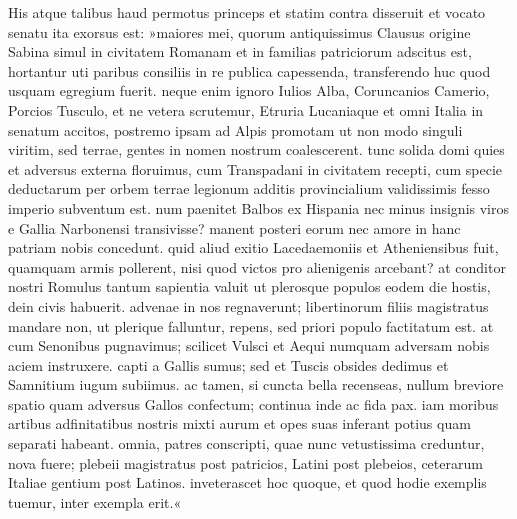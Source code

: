 His atque talibus haud permotus princeps et statim contra disseruit et vocato senatu ita exorsus est: »maiores mei, quorum antiquissimus Clausus origine Sabina simul in civitatem Romanam et in familias patriciorum adscitus est, hortantur uti paribus consiliis in re publica capessenda, transferendo huc quod usquam egregium fuerit. neque enim ignoro Iulios Alba, Coruncanios Camerio, Porcios Tusculo, et ne vetera scrutemur, Etruria Lucaniaque et omni Italia in senatum accitos, postremo ipsam ad Alpis promotam ut non modo singuli viritim, sed terrae, gentes in nomen nostrum coalescerent. tunc solida domi quies et adversus externa floruimus, cum Transpadani in civitatem recepti, cum specie deductarum per orbem terrae legionum additis provincialium validissimis fesso imperio subventum est. num paenitet Balbos ex Hispania nec minus insignis viros e Gallia Narbonensi transivisse? manent posteri eorum nec amore in hanc patriam nobis concedunt. quid aliud exitio Lacedaemoniis et Atheniensibus fuit, quamquam armis pollerent, nisi quod victos pro alienigenis arcebant? at conditor nostri Romulus tantum sapientia valuit ut plerosque populos eodem die hostis, dein civis habuerit. advenae in nos regnaverunt; libertinorum filiis magistratus mandare non, ut plerique falluntur, repens, sed priori populo factitatum est. at cum
Senonibus pugnavimus; scilicet Vulsci et Aequi numquam adversam nobis aciem instruxere. capti a Gallis sumus; sed et Tuscis obsides dedimus et Samnitium iugum subiimus. ac tamen, si cuncta bella recenseas, nullum breviore spatio quam adversus Gallos confectum; continua inde ac fida pax. iam moribus artibus adfinitatibus nostris mixti aurum et opes suas inferant potius quam separati habeant. omnia, patres conscripti, quae nunc vetustissima creduntur, nova fuere; plebeii magistratus post patricios, Latini post plebeios, ceterarum Italiae gentium post Latinos. inveterascet hoc quoque, et quod hodie exemplis tuemur, inter exempla erit.«
